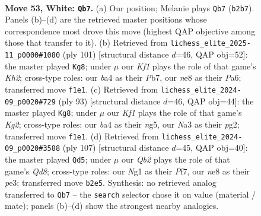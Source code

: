 \documentclass[11pt]{article}
\begin{document}
\clearpage

\begin{figure}[p]\centering
\begin{subfigure}{0.46\textwidth}\centering
\resizebox{\linewidth}{!}{%
\newchessgame
\chessboard[
  setfen={4n1k1/8/p3P3/3P1p1p/b5p1/N7/1Q3P2/5KNq w - - 1 53},
  showmover=false,
  pgfstyle=straightmove, color=movearrow, markmove={b2-b7}
]}
\caption{}
\end{subfigure}\hfill
\begin{subfigure}{0.46\textwidth}\centering
\resizebox{\linewidth}{!}{%
\newchessgame
\chessboard[
  setfen={8/1p4pk/pP5p/P7/3Pq3/3n1N2/2Q3P1/7K b - - 17 51},
  showmover=false,
  pgfstyle=straightmove, color=movearrow, markmove={h7-g8}
]}
\caption{}
\end{subfigure}
\\[4pt]
\begin{subfigure}{0.46\textwidth}\centering
\resizebox{\linewidth}{!}{%
\newchessgame
\chessboard[
  setfen={8/3q2k1/1p4p1/1P1nPpN1/3Q4/8/6PK/8 b - - 3 47},
  showmover=false,
  pgfstyle=straightmove, color=movearrow, markmove={g7-g8}
]}
\caption{}
\end{subfigure}\hfill
\begin{subfigure}{0.46\textwidth}\centering
\resizebox{\linewidth}{!}{%
\newchessgame
\chessboard[
  setfen={8/4Qp1k/3np2p/8/7P/4P1NK/5P2/3q4 b - - 3 54},
  showmover=false,
  pgfstyle=straightmove, color=movearrow, markmove={d1-d5}
]}
\caption{}
\end{subfigure}
\caption{\textbf{Move 53, White: \texttt{Qb7}.} (a) Our position; Melanie plays \texttt{Qb7} (\texttt{b2b7}). Panels (b)--(d) are the retrieved master positions whose correspondence most drove this move (highest QAP objective among those that transfer to it). (b) Retrieved from \texttt{lichess\_elite\_2025-11\_p0000\#1080} (ply 101) [structural distance $d$=46, QAP obj=52]: the master played \texttt{Kg8}; under $\mu$ our \emph{Kf1} plays the role of that game's \emph{Kh2}; cross-type roles: our \emph{b}a4 as their \emph{P}b7, our \emph{n}e8 as their \emph{P}a6; transferred move \texttt{f1e1}. (c) Retrieved from \texttt{lichess\_elite\_2024-09\_p0020\#729} (ply 93) [structural distance $d$=46, QAP obj=44]: the master played \texttt{Kg8}; under $\mu$ our \emph{Kf1} plays the role of that game's \emph{Kg2}; cross-type roles: our \emph{b}a4 as their \emph{n}g5, our \emph{N}a3 as their \emph{p}g2; transferred move \texttt{f1e1}. (d) Retrieved from \texttt{lichess\_elite\_2024-09\_p0020\#3588} (ply 107) [structural distance $d$=45, QAP obj=40]: the master played \texttt{Qd5}; under $\mu$ our \emph{Qb2} plays the role of that game's \emph{Qd8}; cross-type roles: our \emph{N}g1 as their \emph{P}f7, our \emph{n}e8 as their \emph{p}e3; transferred move \texttt{b2e5}. Synthesis: no retrieved analog transferred to \texttt{Qb7} -- the \texttt{search} selector chose it on value (material / mate); panels (b)--(d) show the strongest nearby analogies.}
\label{fig:thought-m104}
\end{figure}
\end{document}
